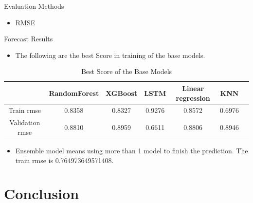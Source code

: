 \documentclass[
 size=12pt,
 paper=smartboard, %
 mode=present, %
 display=slides, %
 style=tuliplab,  %
 pauseslide,
 fleqn,leqno,clock]{powerdot}
\begin{document}
\begin{slide}{Evaluation Methods}
	\begin{center}
		\begin{itemize}
			\item RMSE
		\end{itemize}
	\end{center}

\end{slide}
\begin{slide}{Forecast Results}
	\begin{itemize}
		\item The following are the best Score in training of the base models.
	\end{itemize}
	\begin{center}
		\begin{table}[h]  \centering
			\caption{Best Score of the Base Models}
			\label{tbl:best_score_base_models_old}
			\begin{tabular}{ccccccc}
				\toprule
				                & RandomForest & XGBoost & LSTM   & Linear regression & KNN
				\\
				\midrule
				Train rmse      & 0.8358       & 0.8327  & 0.9276 &
				0.8572          & 0.6976                                                    \\
				Validation rmse & 0.8810       & 0.8959  & 0.6611 &
				0.8806          & 0.8946                                                    \\
				\bottomrule
			\end{tabular}
		\end{table}
	\end{center}
	\begin{itemize}
		\item Ensemble model means using
		      more than 1 model to finish the prediction.
		      The train rmse is 0.764973649571408.
	\end{itemize}

\end{slide}




\section{Conclusion}
\end{document}
